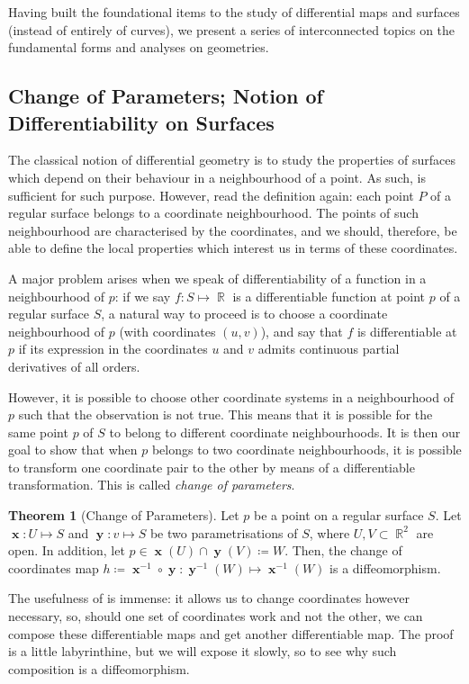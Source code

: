\documentclass{amsart} %
\theoremstyle{mytheoremstyle}
\theoremstyle{definition}
\newtheorem{theorem}[definition]{Theorem}
\numberwithin{equation}{section}
\DeclareMathOperator{\R}{\mathbb{R}}
\DeclareMathOperator{\1}{\mathbbm{1}}
\DeclareMathOperator{\x}{\mathbf{x}}
\DeclareMathOperator{\y}{\mathbf{y}}
\begin{document}
Having built the foundational items to the study of differential maps and surfaces (instead of entirely of curves), we present a series of interconnected topics on the fundamental forms and analyses on geometries.

\subsection{Change of Parameters; Notion of Differentiability on Surfaces}
The classical notion of differential geometry is to study the properties of surfaces which depend on their behaviour in a neighbourhood of a point. As such,  is sufficient for such purpose. However, read the definition again: each point $P$ of a regular surface belongs to a coordinate neighbourhood. The points of such neighbourhood are characterised by the coordinates, and we should, therefore, be able to define the local properties which interest us in terms of these coordinates.

A major problem arises when we speak of differentiability of a function in a neighbourhood of $p$: if we say $f: S \mapsto \R$ is a differentiable function at point $p$ of a regular surface $S$, a natural way to proceed is to choose a coordinate neighbourhood of $p$ (with coordinates $(u,v)$), and say that $f$ is differentiable at $p$ if its expression in the coordinates $u$ and $v$ admits continuous partial derivatives of all orders.

However, it is possible to choose other coordinate systems in a neighbourhood of $p$ such that the observation is not true. This means that it is possible for the same point $p$ of $S$ to belong to different coordinate neighbourhoods. It is then our goal to show that when $p$ belongs to two coordinate neighbourhoods, it is possible to transform one coordinate pair to the other by means of a differentiable transformation. This is called \textit{change of parameters}.


\begin{theorem}[Change of Parameters]
	\label{thmchangeofparameters}
	Let $p$ be a point on a regular surface $S$. Let $\x: U \mapsto S$ and $\y: v \mapsto S$ be two parametrisations of $S$, where $U,V \subset \R^2$ are open. In addition, let $p \in \x(U) \cap \y(V) \coloneqq W$. Then, the change of coordinates map $h \coloneqq \x^{-1} \circ \y : \y^{-1}(W) \mapsto \x^{-1} (W)$ is a diffeomorphism.
\end{theorem}

The usefulness of  is immense: it allows us to change coordinates however necessary, so, should one set of coordinates work and not the other, we can compose these differentiable maps and get another differentiable map. The proof is a little labyrinthine, but we will expose it slowly, so to see why such composition is a diffeomorphism.
\end{document}
